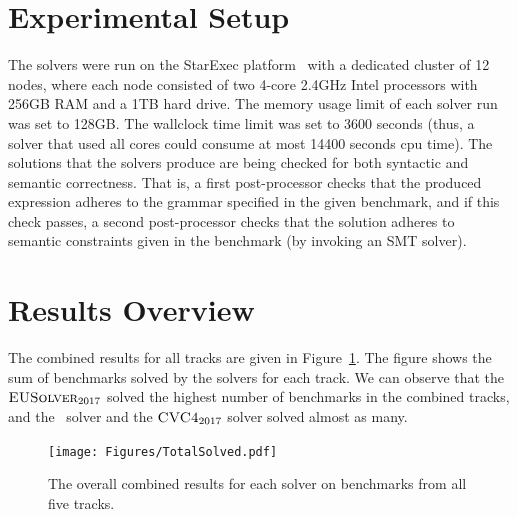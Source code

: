 




\section{Experimental Setup} 
\label{sec:exp-set}
The solvers were run on the StarExec platform~\cite{starexec} with a dedicated cluster of 12 nodes, where each node
consisted of two 4-core 2.4GHz Intel processors with 256GB RAM and a 1TB hard drive. The memory
usage limit of each solver run was set to 128GB. The wallclock time limit was set to 3600 seconds (thus,
a solver that used all cores could consume at most 14400 seconds cpu time).
The solutions that the solvers produce are being checked for both syntactic and semantic correctness.
That is, a first post-processor checks that the produced expression adheres to the grammar specified in
the given benchmark, and if this check passes, a second post-processor checks that the solution adheres
to semantic constraints given in the benchmark (by invoking an SMT solver).




\section{Results Overview}
\label{sec:comp-results}
The combined results for all tracks are given in Figure~\ref{fig:combinedresults}. The figure shows the sum of benchmarks solved by the solvers for each track. We can observe that the $\textsc{EUSolver}_{2017}$ solved the highest number of benchmarks in the combined tracks, and   the \euphony\ solver and the $\textsc{CVC4}_{2017}$ solver  solved almost as many.


\begin{figure}
	\centering
	\texttt{[image: Figures/TotalSolved.pdf]}
	\caption{The overall combined results for each solver on benchmarks from all five tracks.}
	\label{fig:combinedresults}
\end{figure}



